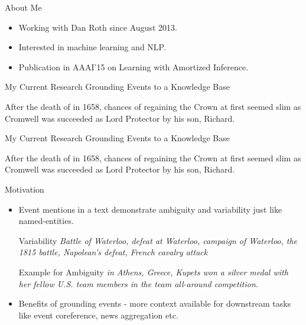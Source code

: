 \begin{frame}{About Me}
\begin{itemize}
\item Working with Dan Roth since August 2013.
\item Interested in machine learning and NLP.
\item Publication in AAAI'15 on Learning with Amortized Inference.
\end{itemize}
\end{frame}

\begin{frame}{My Current Research}
Grounding Events to a Knowledge Base

\begin{block}{}
After the death of  in 1658,  chances of regaining the Crown at first seemed slim as Cromwell was succeeded as Lord Protector by his son, Richard.
\end{block}

\end{frame}

\begin{frame}{My Current Research}
Grounding Events to a Knowledge Base

\begin{block}{}
After the {\color{blue} death of } in 1658,  chances of regaining the Crown at first seemed slim as Cromwell was succeeded as Lord Protector by his son, Richard.
\end{block}

\end{frame}

\begin{frame}{Motivation}
\begin{itemize}
\item Event mentions in a text demonstrate ambiguity and variability just like named-entities.
\begin{exampleblock}{Variability}
\emph{Battle of Waterloo, defeat at Waterloo, campaign of Waterloo, the 1815 battle, Napolean's defeat, French cavalry attack}
\end{exampleblock}
\begin{exampleblock}{Example for Ambiguity}
\emph{ in Athens, Greece, Kupets won a silver medal with her fellow U.S. team members in the team all-around competition.}
\end{exampleblock}
\item Benefits of grounding events - more context available for downstream tasks like event coreference, news aggregation etc.
\end{itemize}
\end{frame}

